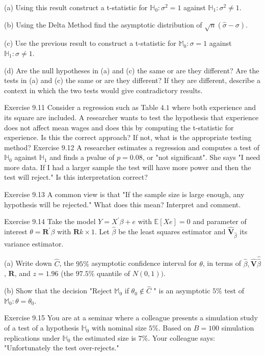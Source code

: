 \documentclass[10pt]{article}
\begin{document}
(a) Using this result construct a t-statistic for $\mathbb{H}_{0}: \sigma^{2}=1$ against $\mathbb{H}_{1}: \sigma^{2} \neq 1$.

(b) Using the Delta Method find the asymptotic distribution of $\sqrt{n}(\widehat{\sigma}-\sigma)$.

(c) Use the previous result to construct a t-statistic for $\mathbb{M}_{0}: \sigma=1$ against $\mathbb{H}_{1}: \sigma \neq 1$.

(d) Are the null hypotheses in (a) and (c) the same or are they different? Are the tests in (a) and (c) the same or are they different? If they are different, describe a context in which the two tests would give contradictory results.

Exercise 9.11 Consider a regression such as Table $4.1$ where both experience and its square are included. A researcher wants to test the hypothesis that experience does not affect mean wages and does this by computing the t-statistic for experience. Is this the correct approach? If not, what is the appropriate testing method? Exercise 9.12 A researcher estimates a regression and computes a test of $\mathbb{H}_{0}$ against $\mathbb{H}_{1}$ and finds a pvalue of $p=0.08$, or "not significant". She says "I need more data. If I had a larger sample the test will have more power and then the test will reject." Is this interpretation correct?

Exercise 9.13 A common view is that "If the sample size is large enough, any hypothesis will be rejected." What does this mean? Interpret and comment.

Exercise 9.14 Take the model $Y=X^{\prime} \beta+e$ with $\mathbb{E}[X e]=0$ and parameter of interest $\theta=\boldsymbol{R}^{\prime} \beta$ with $\boldsymbol{R} k \times 1$. Let $\widehat{\beta}$ be the least squares estimator and $\widehat{\boldsymbol{V}}_{\widehat{\beta}}$ its variance estimator.

(a) Write down $\widehat{C}$, the $95 \%$ asymptotic confidence interval for $\theta$, in terms of $\widehat{\beta}, \widehat{\boldsymbol{V}} \widehat{\widehat{\beta}}$, $\boldsymbol{R}$, and $z=1.96$ (the $97.5 \%$ quantile of $N(0,1))$.

(b) Show that the decision "Reject $\mathbb{M}_{0}$ if $\theta_{0} \notin \widehat{C}$ " is an asymptotic $5 \%$ test of $\mathbb{M}_{0}: \theta=\theta_{0}$.

Exercise 9.15 You are at a seminar where a colleague presents a simulation study of a test of a hypothesis $\mathbb{H}_{0}$ with nominal size $5 \%$. Based on $B=100$ simulation replications under $\mathbb{H}_{0}$ the estimated size is $7 \%$. Your colleague says: "Unfortunately the test over-rejects."
\end{document}
